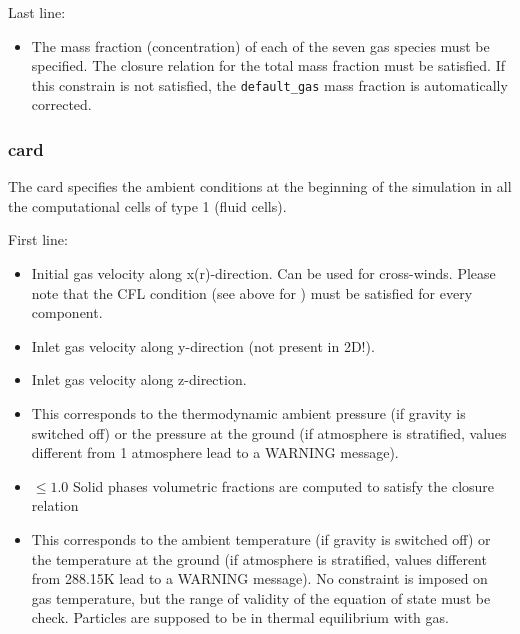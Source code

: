 Last line:

\begin{itemize}

\item
{}
{The mass fraction (concentration) of each of the seven gas species must be
specified. The closure relation for the total mass fraction must be satisfied.
If this constrain is not satisfied, the {\tt default\_gas} mass fraction is
automatically corrected.}

\end{itemize}

\subsubsection{ card}

The  card specifies the ambient conditions at 
the beginning of the simulation in all the computational cells of
type 1 (fluid cells).

First line:

\begin{itemize}
\item
{}
{Initial gas velocity along x(r)-direction. Can be used for cross-winds. 
Please note that the CFL condition (see above for ) 
must be satisfied for every component.}

\item
{}
{Inlet gas velocity along y-direction (not present in 2D!).}

\item
{}
{Inlet gas velocity along z-direction.}

\item
{}
{This corresponds to the thermodynamic ambient pressure (if gravity is switched off) 
or the pressure at the ground (if atmosphere is stratified, values different from 1 atmosphere
lead to a WARNING message).}

\item
{}
{ $\le 1.0$}
{Solid phases volumetric fractions are computed to satisfy the closure relation}

\item
{}
{This corresponds to the ambient temperature (if gravity is switched off) 
or the temperature at the ground (if atmosphere is stratified, values different from 288.15K
lead to a WARNING message).
No constraint is imposed on gas temperature, but the range of validity
of the equation of state must be check. Particles are supposed to be in thermal
equilibrium with gas.}
\end{itemize}

